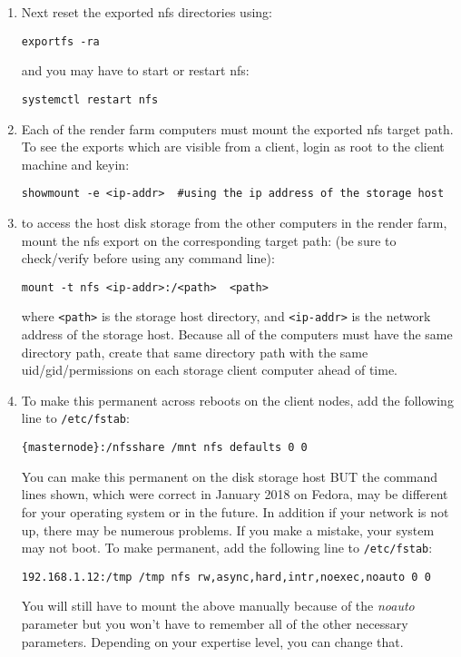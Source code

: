 \begin{description}
\begin{enumerate}
        \item Next reset the exported nfs directories using:
        \begin{lstlisting}[style=sh]
exportfs -ra
        \end{lstlisting}
        and you may have to start or restart nfs:
        \begin{lstlisting}[style=sh]
systemctl restart nfs
        \end{lstlisting}
        \item Each of the render farm computers must mount the exported nfs target path.  To see the exports
        which are visible from a client, login as root to the client machine and keyin:
        \begin{lstlisting}[style=sh]
showmount -e <ip-addr>  #using the ip address of the storage host
        \end{lstlisting}
        \item to access the host disk storage from the other computers in the render farm, mount the nfs export on
        the corresponding target path: (be sure to check/verify before using any command line):
        \begin{lstlisting}[style=sh]
mount -t nfs <ip-addr>:/<path>  <path>
        \end{lstlisting}
        where \texttt{<path>} is the storage host directory, and \texttt{<ip-addr>} is the network address of the storage host.
        Because all of the computers must have the same directory path, create that same directory path with the same uid/gid/permissions on each storage client computer ahead of time.
        \item To make this permanent across reboots on the client nodes, add the following line to \texttt{/etc/fstab}:
        \begin{lstlisting}[style=sh]
{masternode}:/nfsshare /mnt nfs defaults 0 0
        \end{lstlisting}
        You can make this permanent on the disk storage host BUT the command lines shown, which were
        correct in January 2018 on Fedora, may be different for your operating system or in the future.  In
        addition if your network is not up, there may be numerous problems.  If you make a mistake, your
        system may not boot.  To make permanent, add the following line to \texttt{/etc/fstab}:
        \begin{lstlisting}[style=sh]
192.168.1.12:/tmp /tmp nfs rw,async,hard,intr,noexec,noauto 0 0
        \end{lstlisting}
        You will still have to mount the above manually because of the \textit{noauto} parameter but you won’t
        have to remember all of the other necessary parameters.  Depending on your expertise level, you can
        change that.


\end{enumerate}
\end{description}
